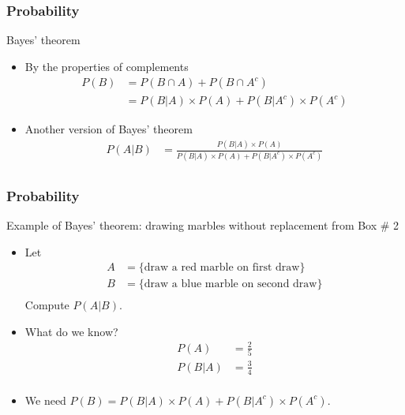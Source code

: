 \documentclass[handout]{beamer}
\begin{document}
   \begin{frame} \frametitle{Probability}

   \begin{block}
   {Bayes' theorem}
   \begin{itemize}
   \item By the properties of complements
   $$
   \begin{aligned}
   P(B) &= P(B \cap A) + P(B \cap A^c) \\
   &=  P(B|A) \times P(A) + P(B|A^c) \times P(A^c)
   \end{aligned}
   $$
   \item Another version of Bayes' theorem
   $$
   \begin{aligned}
   P(A|B) &= \frac{P(B|A) \times P(A)}{P(B|A) \times P(A) + P(B|A^c) \times P(A^c)     } \\
   \end{aligned}
   $$

   \end{itemize}
   \end{block}
   \end{frame}


   \begin{frame} \frametitle{Probability}

   \begin{block}
   {Example of Bayes' theorem: drawing marbles without replacement from Box \# 2}
   \begin{itemize}
   \item Let
   $$
   \begin{aligned}
   A&=\{\text{draw a red marble on first draw}\} \\
   B&=\{\text{draw a blue marble on second draw}\} \\
   \end{aligned}
   $$
   Compute $P(A|B)$.
   \item  What do we know?
   $$
   \begin{aligned}
   P(A) &= \frac{2}{5} \\
   P(B|A) &= \frac{3}{4} \\
   \end{aligned}
   $$
   \item We need $P(B) = P(B|A) \times P(A) + P(B|A^c) \times P(A^c)$.
   \end{itemize}
   \end{block}
   \end{frame}
\end{document}

